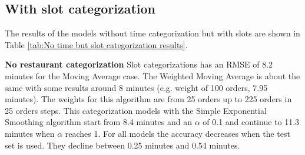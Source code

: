 \subsection{With slot categorization}
The results of the models without time categorization but with slots are shown in Table \ref{tab:No time but slot categorization results}.
\begin{table}[h]
\centering
\caption{No time but slot categorization}
\label{tab:No time but slot categorization results}
\end{table}
\newline\newline\textbf{No restaurant categorization}\newline
Slot categorizations has an RMSE of 8.2 minutes for the Moving Average case. The Weighted Moving Average is about the same with some results around 8 minutes (e.g. weight of 100 orders, 7.95 minutes). The weights for this algorithm are from 25 orders up to 225 orders in 25 orders steps. This categorization models with the Simple Exponential Smoothing algorithm start from 8.4 minutes and an $\alpha$ of 0.1 and continue to 11.3 minutes when $\alpha$ reaches 1. For all models the accuracy decreases when the test set is used. They decline between 0.25 minutes and 0.54 minutes.\newline

